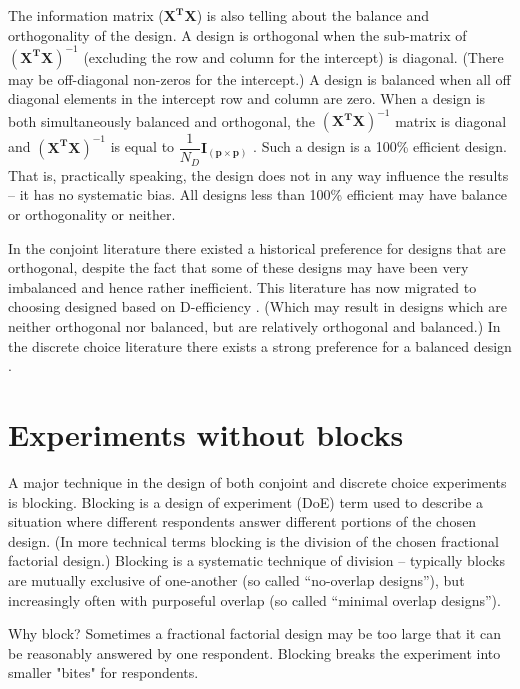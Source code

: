 \documentclass[article, crop=false]{standalone}
\begin{document}
The information matrix ($\mathbf{X^{T}X}$) is also telling about the balance and orthogonality of the design.
A design is orthogonal when the sub-matrix of $(\mathbf{X^{T}X})^{-1}$ (excluding the row and column for the intercept) is diagonal. (There may be off-diagonal non-zeros for the intercept.)
A design is balanced when all off diagonal elements in the intercept row and column are zero.
When a design is both simultaneously balanced and orthogonal, the $(\mathbf{X^{T}X})^{-1}$ matrix is diagonal and $(\mathbf{X^{T}X})^{-1}$ is equal to $\dfrac{1}{N_D}\mathbf{I_{(p\times p)}}$ \citep[63]{kuhfeld2010marketingresearch}.
Such a design is a 100\% efficient design.
That is, practically speaking, the design does not in any way influence the results -- it has no systematic bias.
All designs less than 100\% efficient may have balance or orthogonality or neither.

In the conjoint literature there existed a historical preference for designs that are orthogonal, despite the fact that some of these designs may have been very imbalanced and hence rather inefficient.
This literature has now migrated to choosing designed based on D-efficiency \citep{kuhfeld2010marketingresearch}.
(Which may result in designs which are neither orthogonal nor balanced, but are relatively orthogonal and balanced.)
In the discrete choice literature there exists a strong preference for a balanced design \citep{hensherrosegreene2015}.

\section{Experiments without blocks}
A major technique in the design of both conjoint and discrete choice experiments is blocking.
Blocking is a design of experiment (DoE) term used to describe a situation where different respondents answer different portions of the chosen design.
(In more technical terms blocking is the division of the chosen fractional factorial design.)
Blocking is a systematic technique of division -- typically blocks are mutually exclusive of one-another (so called \enquote{no-overlap designs}), but increasingly often with purposeful overlap (so called \enquote{minimal overlap designs}).

Why block?
Sometimes a fractional factorial design may be too large that it can be reasonably answered by one respondent.
Blocking breaks the experiment into smaller "bites" for respondents.
\end{document}

